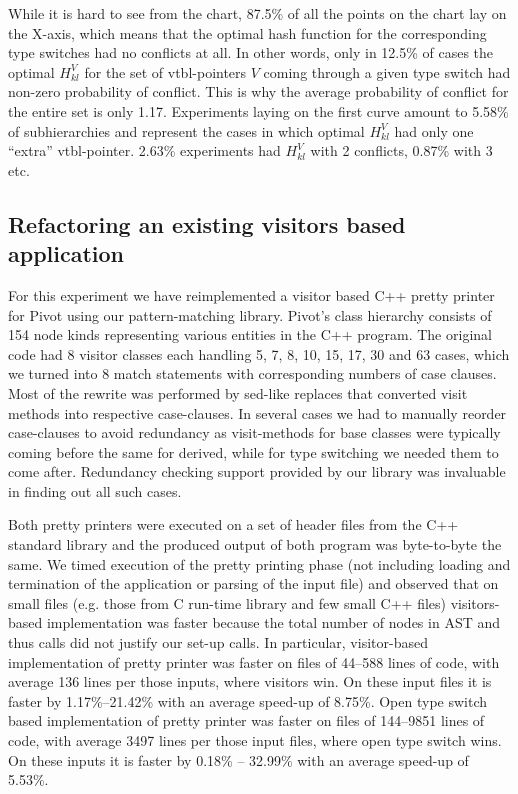 While it is hard to see from the chart, 87.5\% of all the points on the chart 
lay on the X-axis, which means that the optimal hash function for the 
corresponding type switches had no conflicts at all. In other words, only in 12.5\% 
of cases the optimal $H_{kl}^V$ for the set of vtbl-pointers $V$ coming through 
a given type switch had non-zero probability of conflict. This is why the 
average probability of conflict for the entire set is only 1.17. Experiments 
laying on the first curve amount to 5.58\% of subhierarchies and represent the 
cases in which optimal $H_{kl}^V$ had only one ``extra'' vtbl-pointer. 2.63\% 
experiments had $H_{kl}^V$ with 2 conflicts, 0.87\% with 3 etc.

\subsection{Refactoring an existing visitors based application}
\label{sec:qualcmp}

For this experiment we have reimplemented a visitor based C++ pretty printer for 
Pivot\cite{Pivot09} using our pattern-matching library. Pivot's class hierarchy 
consists of 154 node kinds representing various entities in the C++ program. The 
original code had 8 visitor classes each handling 5, 7, 8, 10, 15, 17, 30 and 63 
cases, which we turned into 8 match statements with corresponding numbers of 
case clauses. Most of the rewrite was performed by sed-like replaces that 
converted visit methods into respective case-clauses. In several cases we had to 
manually reorder case-clauses to avoid redundancy as visit-methods for base classes 
were typically coming before the same for derived, while for type switching we 
needed them to come after. Redundancy checking support provided by our library 
was invaluable in finding out all such cases.

Both pretty printers were executed on a set of header files from the C++ 
standard library and the produced output of both program was byte-to-byte the same. 
We timed execution of the pretty printing phase (not including loading and termination 
of the application or parsing of the input file) and observed that on small 
files (e.g. those from C run-time library and few small C++ files) 
visitors-based implementation was faster because the total number of nodes in 
AST and thus calls did not justify our set-up calls. In particular, 
visitor-based implementation of pretty printer was faster on files of 44--588  
lines of code, with average 136 lines per those inputs, where visitors win. On 
these input files it is faster by 1.17\%--21.42\% with an average speed-up of 
8.75\%. Open type switch based implementation of pretty printer was faster on 
files of 144--9851 lines of code, with average 3497 lines per those input files, 
where open type switch wins. On these inputs it is faster by 0.18\% -- 32.99\% 
with an average speed-up of 5.53\%.

